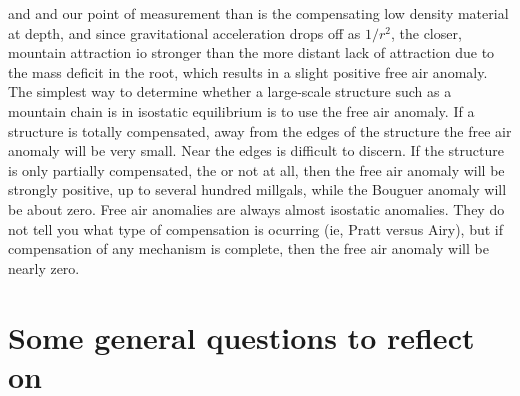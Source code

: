 \documentclass[a4paper,12pt]{article}
\begin{document}
\begin{tcolorbox}[enhanced jigsaw,breakable,pad at break*=1mm,
    colback=blue!5!white,colframe=babyblueeyes,title=Solutions]
    and and our point of measurement than is the compensating low density material at depth, and since gravitational acceleration drops off as $1/r^2$, the closer, mountain attraction io stronger than the more distant lack of attraction due to the mass deficit in the root, which results in a slight positive free air anomaly. The simplest way to determine whether a large-scale structure such as a mountain chain is in isostatic equilibrium is to use the free air anomaly. If a structure is totally compensated, away from the edges of the structure the free air anomaly will be very small. Near the edges is difficult to discern. If the structure is only partially compensated, the or not at all, then the free air anomaly will be strongly positive, up to several hundred millgals, while the Bouguer anomaly will be about zero. Free air anomalies are always almost isostatic anomalies. They do not tell you what type of compensation is ocurring (ie, Pratt versus Airy), but if compensation of any mechanism is complete, then the free air anomaly will be nearly zero.
  \end{tcolorbox}
\fi


\section{Some general questions to reflect on}
\end{document}
